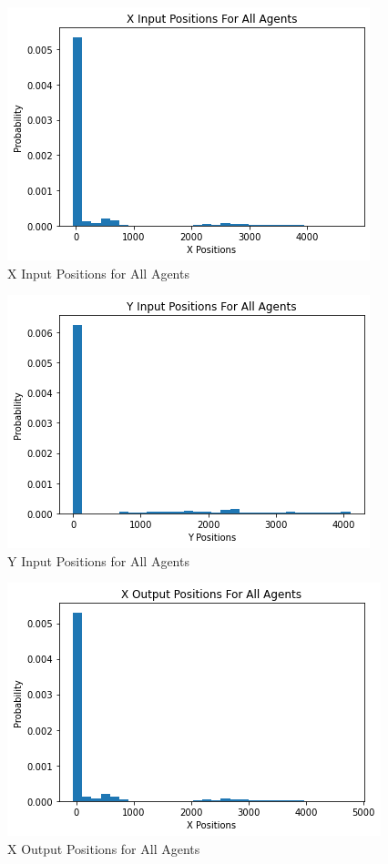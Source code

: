 \documentclass{article}
\begin{document}
\begin{figure}[H]
    \centering
    \includegraphics[scale=.5]{p_in_x .png}
    \caption{X Input Positions for All Agents}
    \label{fig:x_input}
\end{figure}
\begin{figure}[H]
    \centering
    \includegraphics[scale=.5]{p_in_y .png}
    \caption{Y Input Positions for All Agents}
    \label{fig:y_input}
\end{figure}
\begin{figure}[H]
    \centering
    \includegraphics[scale=.5]{p_out_x.png}
    \caption{X Output Positions for All Agents}
    \label{fig:x_output}
\end{figure}
\end{document}
